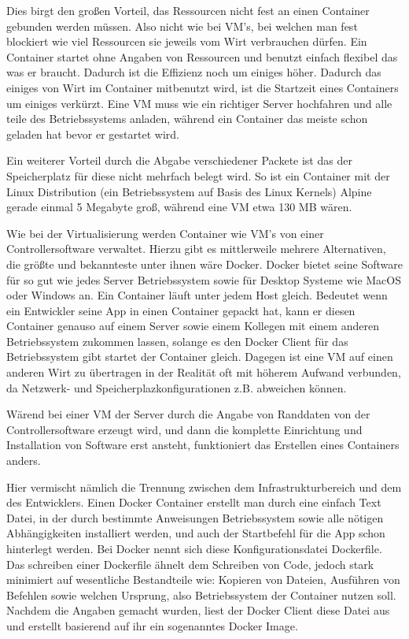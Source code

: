 Dies birgt den großen Vorteil, das Ressourcen nicht fest an einen Container gebunden werden müssen. Also nicht wie bei VM's, bei welchen man fest blockiert wie viel Ressourcen sie jeweils vom Wirt verbrauchen dürfen.
Ein Container startet ohne Angaben von Ressourcen und benutzt einfach flexibel das was er braucht. Dadurch ist die Effizienz noch um einiges höher.
Dadurch das einiges von Wirt im Container mitbenutzt wird, ist die Startzeit eines Containers um einiges verkürzt. Eine VM muss wie ein richtiger Server hochfahren und alle teile des Betriebssystems anladen, während ein Container das meiste schon geladen hat bevor er gestartet wird.

Ein weiterer Vorteil durch die Abgabe verschiedener Packete ist das der Speicherplatz für diese nicht mehrfach belegt wird. So ist ein Container mit der
Linux Distribution (ein Betriebssystem auf Basis des Linux Kernels) Alpine gerade einmal 5 Megabyte groß, während eine VM etwa 130 MB wären.

Wie bei der Virtualisierung werden Container wie VM's von einer Controllersoftware verwaltet. Hierzu gibt es mittlerweile mehrere Alternativen, die größte und bekannteste unter ihnen wäre Docker.
Docker bietet seine Software für so gut wie jedes Server Betriebssystem sowie für Desktop Systeme wie MacOS oder Windows an. Ein Container läuft unter jedem Host gleich.
Bedeutet wenn ein Entwickler seine App in einen Container gepackt hat, kann er diesen Container genauso auf einem Server sowie einem Kollegen mit einem anderen Betriebssystem zukommen lassen, 
solange es den Docker Client für das Betriebssystem gibt startet der Container gleich.
Dagegen ist eine VM auf einen anderen Wirt zu übertragen in der Realität oft mit höherem Aufwand verbunden, da Netzwerk- und Speicherplazkonfigurationen z.B. abweichen können.

Wärend bei einer VM der Server durch die Angabe von Randdaten von der Controllersoftware erzeugt wird, und dann die komplette Einrichtung und Installation von Software erst ansteht, 
funktioniert das Erstellen eines Containers anders.

Hier vermischt nämlich die Trennung zwischen dem Infrastrukturbereich und dem des Entwicklers. Einen Docker Container erstellt man durch eine einfach Text Datei, in der durch 
bestimmte Anweisungen Betriebssystem sowie alle nötigen Abhängigkeiten installiert werden, und auch der Startbefehl für die App schon hinterlegt werden. 
Bei Docker nennt sich diese Konfigurationsdatei Dockerfile. Das schreiben einer Dockerfile ähnelt dem Schreiben von Code, jedoch stark minimiert auf 
wesentliche Bestandteile wie: Kopieren von Dateien, Ausführen von Befehlen sowie welchen Ursprung, also Betriebssystem der Container nutzen soll.
Nachdem die Angaben gemacht wurden, liest der Docker Client diese Datei aus und erstellt basierend auf ihr ein sogenanntes Docker Image.

